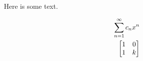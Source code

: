 \documentclass[letter,12pt,article,oneside]{memoir}
\begin{document}
Here is some text.

\begin{align*}
 \sum_{n = 1}^{\infty} c_n x^{n}\\
 \begin{bmatrix} 1&0\\1&k \end{bmatrix}
\end{align*}
\end{document}
